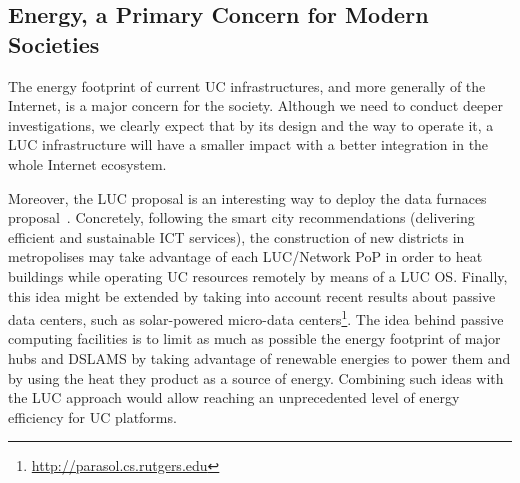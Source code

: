 \subsection{Energy, a Primary Concern for Modern Societies}

%
The energy footprint of current UC infrastructures, and more generally of the
Internet, is a major concern for the society.   Although we need to conduct
deeper investigations, we clearly expect that by its design and the way  to
operate it, a LUC infrastructure will have a smaller impact with a better
integration in the whole Internet ecosystem.

 Moreover, the LUC proposal is an interesting way to
deploy the data furnaces proposal~\cite{liu:hotcloud11}.  Concretely, following
the smart city recommendations (\ie delivering efficient and
sustainable ICT services), the construction of new districts in metropolises
may take advantage of each LUC/Network PoP in order to heat buildings while
operating UC resources remotely by means of a LUC OS. Finally, this idea might
be extended by taking into account recent results about passive data centers,
such as solar-powered
micro-data centers\footnote{\href{http://parasol.cs.rutgers.edu}{\url{http://parasol.cs.rutgers.edu}}}.
The idea behind passive computing facilities is to limit as much as possible
the energy footprint of major hubs and DSLAMS by taking advantage of renewable
energies to power them and by using the heat they product as a source of
energy. Combining such ideas with the LUC approach would allow reaching an
unprecedented level of energy efficiency for UC platforms.

